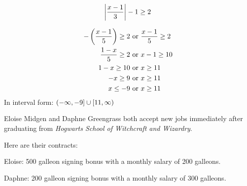 \documentclass[letterpaper]{exam}
\begin{document}
\begin{questions}
      \question[10]
        \[ 
          \abs{ \frac{x - 1}{3} } - 1 \geq 2 
        \]
        \begin{solution}
          \begin{align*}
            -\del{ \frac{x - 1}{5} } \geq 2 & \text{ or } \frac{x - 1}{5} \geq 2 \\
            \frac{1 - x}{5} \geq 2          & \text{ or } x - 1 \geq 10 \\
            1 - x \geq 10                   & \text{ or } x \geq 11 \\
            -x \geq 9                       & \text{ or } x \geq 11 \\
            x \leq -9                       & \text{ or } x \geq 11 \\
          \end{align*}
          In interval form: $\intoc{ -\infty, -9 } \cup \intco{ 11, \infty }$
        \end{solution}



    \question[10]
    Eloise Midgen and Daphne Greengrass both accept new jobs immediately after graduating from
    {\em Hogwarts School of Witchcraft and Wizardry}. 
    
    Here are their contracts:

    \begin{itemize*}
      \item Eloise: 500 galleon signing bonus with a monthly salary of 200 galleons. 
      \item Daphne: 200 galleon signing bonus with a monthly salary of 300 galleons. 
    \end{itemize*}


\end{questions}
\end{document}

